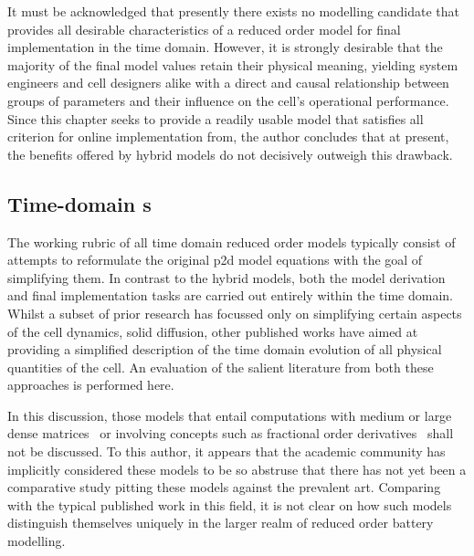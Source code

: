 It must be acknowledged that presently  there exists no modelling candidate that
provides  all desirable  characteristics  of  a reduced  order  model for  final
implementation in  the time domain. However,  it is strongly desirable  that the
majority  of the  final model  values  retain their  physical meaning,  yielding
system engineers and cell designers alike  with a direct and causal relationship
between  groups of  parameters and  their  influence on  the cell's  operational
performance. Since  this chapter seeks  to provide  a readily usable  model that
satisfies  all  criterion  for online  implementation
from, the  author  concludes that  at  present, the  benefits
offered by hybrid models do not decisively outweigh this drawback.


\subsection{Time-domain s}
The working rubric of all time  domain reduced order models typically consist of
attempts to reformulate the original \gls{p2d}  model equations with the goal of
simplifying them.  In contrast to the  hybrid models, both the  model derivation
and  final  implementation  tasks  are  carried out  entirely  within  the  time
domain.  Whilst a  subset of  prior research  has focussed  only on  simplifying
certain aspects  of the  cell dynamics, \eg{}  solid diffusion,  other published
works  have aimed  at  providing a  simplified description  of  the time  domain
evolution of all  physical quantities of the cell. An  evaluation of the salient
literature  from both  these  approaches is  performed here.


In this discussion,  those models that entail computations with  medium or large
dense  matrices~\cite{Li2016,Xu2016,Corno2015}  or  involving concepts  such  as
fractional  order  derivatives~\cite{Sabatier2014,Sabatier2015, Li2017,  Mu2017,
Wang2017} shall not  be discussed. To this author, it  appears that the academic
community has  implicitly considered these models  to be so abstruse  that there
has not yet been a comparative  study pitting these models against the prevalent
art. Comparing with the typical published work in this field, it is not clear on
how such models  distinguish themselves uniquely in the larger  realm of reduced
order battery modelling.


